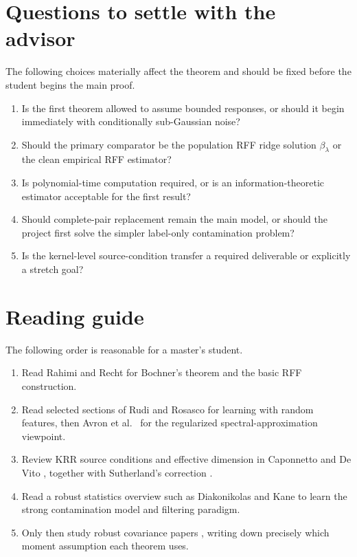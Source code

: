 \documentclass[11pt]{article}
\begin{document}
\section{Questions to settle with the advisor}

The following choices materially affect the theorem and should be fixed before
the student begins the main proof.
\begin{enumerate}
 \item Is the first theorem allowed to assume bounded responses, or should it
       begin immediately with conditionally sub-Gaussian noise?
 \item Should the primary comparator be the population RFF ridge solution
       $\beta_\lambda$ or the clean empirical RFF estimator?
 \item Is polynomial-time computation required, or is an information-theoretic
       estimator acceptable for the first result?
 \item Should complete-pair replacement remain the main model, or should the
       project first solve the simpler label-only contamination problem?
 \item Is the kernel-level source-condition transfer a required deliverable or
       explicitly a stretch goal?
\end{enumerate}

\section{Reading guide}

The following order is reasonable for a master's student.
\begin{enumerate}
 \item Read Rahimi and Recht \cite{rahimi2007} for Bochner's theorem and the
       basic RFF construction.
 \item Read selected sections of Rudi and Rosasco \cite{rudi2017} for learning
       with random features, then Avron et al.\ \cite{avron2017} for the
       regularized spectral-approximation viewpoint.
 \item Review KRR source conditions and effective dimension in Caponnetto and
       De Vito \cite{caponnetto2007}, together with Sutherland's correction
       \cite{sutherland2017}.
 \item Read a robust statistics overview such as Diakonikolas and Kane
       \cite{diakonikolas2019} to learn the strong contamination model and
       filtering paradigm.
 \item Only then study robust covariance papers
       \cite{abdalla2022,oliveira2022,minsker2022}, writing down precisely which
       moment assumption each theorem uses.
\end{enumerate}
\end{document}
